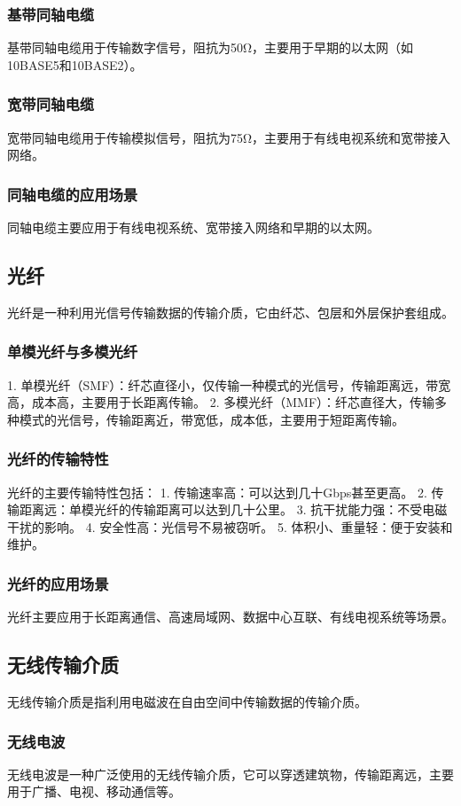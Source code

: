 \documentclass{book}
\begin{document}
\subsubsection{基带同轴电缆}
基带同轴电缆用于传输数字信号，阻抗为50Ω，主要用于早期的以太网（如10BASE5和10BASE2）。
\subsubsection{宽带同轴电缆}
宽带同轴电缆用于传输模拟信号，阻抗为75Ω，主要用于有线电视系统和宽带接入网络。
\subsubsection{同轴电缆的应用场景}
同轴电缆主要应用于有线电视系统、宽带接入网络和早期的以太网。
\subsection{光纤}
光纤是一种利用光信号传输数据的传输介质，它由纤芯、包层和外层保护套组成。
\subsubsection{单模光纤与多模光纤}
1. 单模光纤（SMF）：纤芯直径小，仅传输一种模式的光信号，传输距离远，带宽高，成本高，主要用于长距离传输。
2. 多模光纤（MMF）：纤芯直径大，传输多种模式的光信号，传输距离近，带宽低，成本低，主要用于短距离传输。
\subsubsection{光纤的传输特性}
光纤的主要传输特性包括：
1. 传输速率高：可以达到几十Gbps甚至更高。
2. 传输距离远：单模光纤的传输距离可以达到几十公里。
3. 抗干扰能力强：不受电磁干扰的影响。
4. 安全性高：光信号不易被窃听。
5. 体积小、重量轻：便于安装和维护。
\subsubsection{光纤的应用场景}
光纤主要应用于长距离通信、高速局域网、数据中心互联、有线电视系统等场景。
\subsection{无线传输介质}
无线传输介质是指利用电磁波在自由空间中传输数据的传输介质。
\subsubsection{无线电波}
无线电波是一种广泛使用的无线传输介质，它可以穿透建筑物，传输距离远，主要用于广播、电视、移动通信等。
\end{document}
